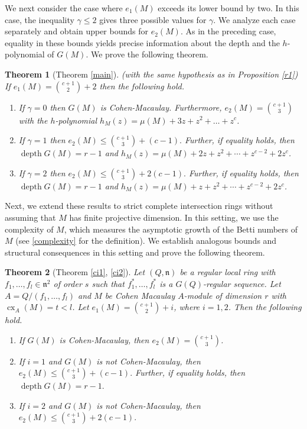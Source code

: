 \documentclass[11pt]{amsart}
\theoremstyle{plain}
\newtheorem{theorem}{Theorem}[section]
\newcommand{\n}{\mathfrak{n}}
\newcommand{\depth}{\operatorname{depth}}
\theoremstyle{plain}
\begin{document}
We next consider the case where $e_1(M)$ exceeds its lower bound by two. In this case, the inequality $\gamma\leq 2$ gives three possible values for $\gamma$. We analyze each case separately and obtain upper bounds for $e_2(M)$. As in the preceding case, equality in these bounds yields precise information about the depth and the $h$-polynomial of $G(M)$. We prove the following theorem.


\begin{theorem} [Theorem \ref{main}]\label{r3}
    (with the same hypothesis as in Proposition \ref{r1})  If $e_1(M)=\binom{c+1}{2}+2$ then the following hold. 
     \begin{enumerate}
         \item  If $\gamma=0$ then $G(M)$ is Cohen-Macaulay. Furthermore,   $e_2(M)=\binom{c+1}{3}$ with the $h$-polynomial $h_M(z)=\mu(M)+3z+z^2+\ldots +z^c$. 
         \item   If $\gamma=1$ then $e_2(M)\leq \binom{c+1}{3}+(c-1).$ Further, if equality holds, then $\depth G(M)= r-1$ and $h_M(z)=\mu(M)+2z+z^2+\cdots+z^{c-2}+2z^c$.
          \item  If $\gamma=2$ then $e_2(M)\leq \binom{c+1}{3}+2(c-1).$ Further, if equality holds, then $\depth G(M)= r-1$ and $h_M(z)= \mu(M)+z+z^2+\cdots+z^{c-2}+2z^c$.
     \end{enumerate} 
\end{theorem}

Next, we extend these results to strict complete intersection rings without assuming that $M$ has finite projective dimension. In this setting, we use the complexity of $M$, which measures the asymptotic growth of the Betti numbers of $M$ (see \ref{complexity} for the definition). We establish analogous bounds and structural consequences in this setting and prove the following theorem.

\begin{theorem}[Theorem \ref{ci1}, \ref{ci2}]\label{r4}
     Let  $(Q,\n)$ be a regular local ring with $f_1,\ldots ,f_l\in \n^2$ of order $s$ such that $f_1^*,\ldots ,f_l^* $ is a $G(Q)$-regular sequence.  Let $A=Q/(f_1,\ldots ,f_l)$ and $M$ be Cohen Macaulay $A$-module of dimension $r$ with $\operatorname{cx}_A(M)=t< l$. Let $e_1(M)= \binom{c+1}{2}+i$, where $i=1,2$. Then the following hold.
\begin{enumerate}
    \item If $G(M)$ is Cohen-Macaulay, then $e_2(M)=\binom{c+1}{3}$.
    \item If $i=1$ and $G(M)$ is not Cohen-Macaulay, then $e_2(M)\leq \binom{c+1}{3}+(c-1).$ Further, if equality holds, then $\depth G(M)=r-1.$
    \item If $i=2$ and $G(M)$ is not Cohen-Macaulay, then $e_2(M)\leq \binom{c+1}{3}+2(c-1).$
\end{enumerate}
\end{theorem}
\end{document}
